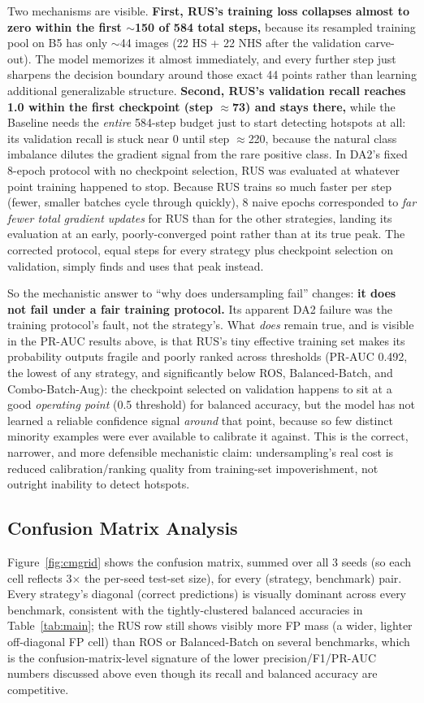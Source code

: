 \documentclass[conference]{IEEEtran}
\begin{document}
Two mechanisms are visible. \textbf{First, RUS's training loss
collapses almost to zero within the first $\sim$150 of 584 total
steps,} because its resampled training pool on B5 has only $\sim$44
images (22 HS + 22 NHS after the validation carve-out). The model
memorizes it almost immediately, and every further step just sharpens
the decision boundary around those exact 44 points rather than
learning additional generalizable structure. \textbf{Second, RUS's
validation recall reaches 1.0 within the first checkpoint (step
$\approx$73) and stays there,} while the Baseline needs the
\emph{entire} 584-step budget just to start detecting hotspots at all:
its validation recall is stuck near 0 until step $\approx$220, because
the natural class imbalance dilutes the gradient signal from the rare
positive class. In DA2's fixed 8-epoch protocol with no checkpoint
selection, RUS was evaluated at whatever point training happened to
stop. Because RUS trains so much faster per step (fewer, smaller
batches cycle through quickly), 8 naive epochs corresponded to
\emph{far fewer total gradient updates} for RUS than for the other
strategies, landing its evaluation at an early, poorly-converged point
rather than at its true peak. The corrected protocol, equal steps for
every strategy plus checkpoint selection on validation, simply finds
and uses that peak instead.

So the mechanistic answer to ``why does undersampling fail'' changes:
\textbf{it does not fail under a fair training protocol.} Its apparent
DA2 failure was the training protocol's fault, not the strategy's.
What \emph{does} remain true, and is visible in the PR-AUC results
above, is that RUS's tiny effective
training set makes its probability outputs fragile and poorly ranked
across thresholds (PR-AUC 0.492, the lowest of any strategy, and
significantly below ROS, Balanced-Batch, and Combo-Batch-Aug): the
checkpoint selected on validation happens to sit at a good
\emph{operating point} (0.5 threshold) for balanced accuracy, but the
model has not learned a reliable confidence signal \emph{around} that
point, because so few distinct minority examples were ever available
to calibrate it against. This is the correct, narrower, and more
defensible mechanistic claim: undersampling's real cost is reduced
calibration/ranking quality from training-set impoverishment, not
outright inability to detect hotspots.

\subsection{Confusion Matrix Analysis}
Figure~\ref{fig:cmgrid} shows the confusion matrix, summed over all 3
seeds (so each cell reflects 3$\times$ the per-seed test-set size), for
every (strategy, benchmark) pair. Every strategy's diagonal (correct
predictions) is visually dominant across every benchmark, consistent
with the tightly-clustered balanced accuracies in
Table~\ref{tab:main}; the RUS row still shows visibly more FP mass
(a wider, lighter off-diagonal FP cell) than ROS or Balanced-Batch on
several benchmarks, which is the confusion-matrix-level signature of
the lower precision/F1/PR-AUC numbers discussed above even though its
recall and balanced accuracy are competitive.
\end{document}
